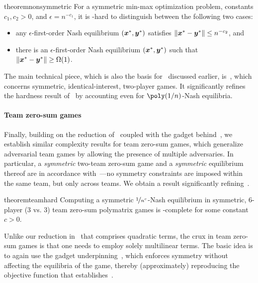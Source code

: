 \begin{restatable}{theorem}{nonsymmetric}
    \label{theorem:non-symmetric}
    For a symmetric min-max optimization problem, constants $c_1, c_2 > 0$, and $\epsilon = n^{-c_1}$, it is \NP-hard to distinguish between the following two cases:
    \begin{itemize}[noitemsep,topsep=0pt]
        \item any $\epsilon$-first-order Nash equilibrium $({\bm{x}}^*, {\bm{y}}^*)$ satisfies $ \|{\bm{x}}^* - {\bm{y}}^* \| \leq n^{-c_2}$, and
        \item there is an $\epsilon$-first-order Nash equilibrium $({\bm{x}}^*, {\bm{y}}^*)$ such that $ \|{\bm{x}}^* - {\bm{y}}^*\| \geq \Omega(1)$.
    \end{itemize}
\end{restatable}

\noindent The main technical piece, which is also the basis for~ discussed earlier, is~, which concerns symmetric, identical-interest, two-player games. It significantly refines the hardness result of~\citet{MCLENNAN2010683} by accounting even for $\poly(1/n)$-Nash equilibria.

\paragraph{Team zero-sum games} Finally, building on the reduction of~ coupled with the gadget behind~, we establish similar complexity results for team zero-sum games, which generalize adversarial team games by allowing the presence of multiple adversaries. 
In particular, a \emph{symmetric} two-team zero-sum game and a \emph{symmetric} equilibrium thereof are in accordance with~---no symmetry constraints are imposed within the same team, but only across teams. We obtain a result significantly refining~.

\begin{restatable}{theorem}{teamhard}
    \label{theorem:team-hard}
    Computing a symmetric $\nicefrac{1}{n^c}$-Nash equilibrium in symmetric, $6$-player ($3$ vs. $3$) team zero-sum polymatrix games is \PPAD-complete for some constant $c>0$.
\end{restatable}

Unlike our reduction in~ that comprises quadratic terms, the crux in team zero-sum games is that one needs to employ solely multilinear terms. The basic idea is to again use the gadget underpinning~, which enforces symmetry without affecting the equilibria of the game, thereby (approximately) reproducing the objective function that establishes~.

